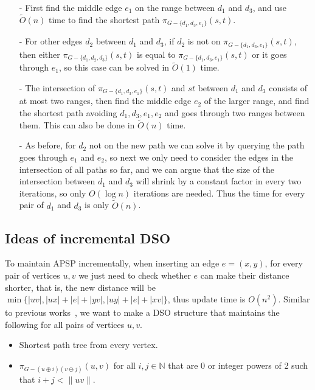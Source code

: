 \documentclass[11pt]{article}
\theoremstyle{plain}
\theoremstyle{definition}
\newcommand{\set}[1]{\{ #1 \}}
\newcommand{\og}[3]{\pi_{G-#3}\left(#1,#2\right)}
\begin{document}
\begin{itemize}
    \item[-] First find the middle edge $e_1$ on the range between $d_1$ and $d_3$, and use $\tilde{O}(n)$ time to find the shortest path $\og{s}{t}{\set{d_1,d_3,e_1}}$.
    \item[-] For other edges $d_2$ between $d_1$ and $d_3$, if $d_2$ is not on $\og{s}{t}{\set{d_1,d_3,e_1}}$, then either $\og{s}{t}{\set{d_1, d_2,d_3}}$ is equal to $\og{s}{t}{\set{d_1,d_3,e_1}}$ or it goes through $e_1$, so this case can be solved in $\tilde{O}(1)$ time.
    \item[-] The intersection of $\og{s}{t}{\set{d_1,d_3,e_1}}$ and $st$ between $d_1$ and $d_3$ consists of at most two ranges, then find the middle edge $e_2$ of the larger range, and find the shortest path avoiding $d_1,d_3,e_1,e_2$ and goes through two ranges between them. This can also be done in $\tilde{O}(n)$ time.
    \item[-] As before, for $d_2$ not on the new path we can solve it by querying the path goes through $e_1$ and $e_2$, so next we only need to consider the edges in the intersection of all paths so far, and we can argue that the size of the intersection between $d_1$ and $d_3$ will shrink by a constant factor in every two iterations, so only $O(\log n)$ iterations are needed. Thus the time for every pair of $d_1$ and $d_3$ is only $\tilde{O}(n)$. 
\end{itemize}


\subsection{Ideas of incremental DSO}

To maintain APSP incrementally, when inserting an edge $e=(x,y)$, for every pair of vertices $u,v$ we just need to check whether $e$ can make their distance shorter, that is, the new distance will be $\min\{|uv|,|ux|+|e|+|yv|,|uy|+|e|+|xv|\}$, thus update time is $O(n^2)$. Similar to previous works~\cite{Demetrescu2008}, we want to make a DSO structure that maintains the following for all pairs of vertices $u,v$.
\begin{itemize}
    \item Shortest path tree from every vertex.
    \item $\og{u}{v}{(u \oplus i)(v \ominus j)}$ for all $i, j\in\mathbb{N}$ that are 0 or integer powers of 2 such that $i+j < \|uv\|$.
\end{itemize}
\end{document}

